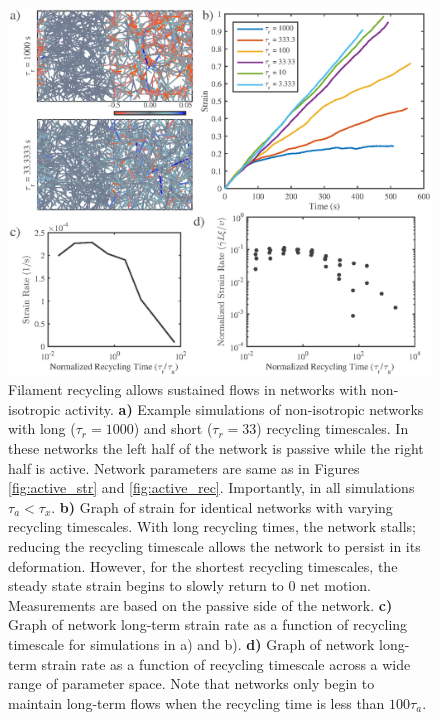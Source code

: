 \documentclass[10pt,letterpaper]{article}
\begin{document}
\begin{figure}[h!]
	\centering
	\includegraphics[width=\hsize]{figures/figure6a}
	\caption{\label{fig:flow_ex}  Filament recycling allows sustained flows in networks with non-isotropic activity. \textbf{a)} Example simulations of non-isotropic networks with long ($\tau_r=1000$) and short ($\tau_r=33$) recycling timescales. In these networks the left half of the network is passive while the right half is active.  Network parameters are same as in Figures \ref{fig:active_str} and \ref{fig:active_rec}. Importantly, in all simulations $\tau_a<\tau_x$. \textbf{b)} Graph of strain for identical networks with varying recycling timescales.  With long recycling times, the network stalls; reducing the recycling timescale allows the network to persist in its deformation.  However, for the shortest recycling timescales, the steady state strain begins to slowly return to 0 net motion.  Measurements are based on the passive side of the network. \textbf{c)} Graph of network long-term strain rate as a function of recycling timescale for simulations in a) and b). \textbf{d)} Graph of network long-term strain rate as a function of recycling timescale across a wide range of parameter space.  Note that networks only begin to maintain long-term flows when the recycling time is less than $100\tau_a$. }
\end{figure}
\end{document}
